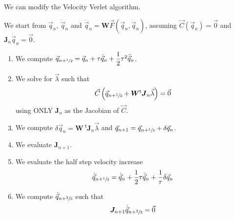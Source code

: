 \documentclass[aps,twocolumn]{revtex4}
\newcommand{\mymat}[1]{\boldsymbol{#1}}
\newcommand{\mytrn}[1]{{\!\!~^{\mathsf{t}}{#1}}}
\newcommand{\half}{\sfrac{1}{2}}
\newcommand{\onethird}{\sfrac{1}{3}}
\newcommand{\twothirds}{\sfrac{2}{3}}
\newcommand{\q}{\vec{q}}
\newcommand{\dq}{\dot{\q}}
\newcommand{\ddq}{\ddot{\q}}
\newcommand{\C}{\vec{C}}
\newcommand{\J}{\mymat{J}}
\newcommand{\W}{\mymat{W}}
\begin{document}
We can modify the Velocity Verlet algorithm.

We start from $\q_n$, $\dq_n$ and $\ddq_n = \W \vec{F}\left(\q_n,\dq_n\right)$,
assuming $\C\left(\q_n\right) = \vec{0}$ and $\J_n \dq_n =\vec{0}$.
\begin{enumerate}
\item We compute $\q_{n+\half} = \q_{n} + \tau \dq_n + \dfrac{1}{2} \tau^2 \ddq_n$.
\item We solve for $\vec{\lambda}$ such that
\begin{equation}
	\C\left(\q_{n+\half}+\W\mytrn{\J}_n\vec{\lambda}\right) = \vec{0} 
\end{equation}
using ONLY $\J_n$ as the Jacobian of $\C$.

\item We compute $\delta\q_n=\W\mytrn{\J}_n\vec{\lambda}$ and $\q_{n+1} = \q_{n+\half} + \delta\q_n$.
\item We evaluate $\J_{n+1}$.
\item We evaluate the half step velocity increase
	$$
		\dq_{n+\onethird} = \dq_n + \dfrac{1}{2} \tau \ddq_n + \dfrac{1}{\tau} \delta\q_n
	$$
\item We compute $\dq_{n+\twothirds}$ such that
$$
	\J_{n+1} \dq_{n+\twothirds} = \vec{0}
$$
\end{enumerate}
\end{document}
